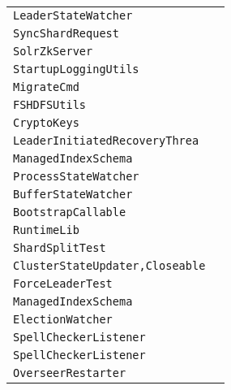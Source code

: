 \begin{center}
\begin{tabular}{ll}
\lstinline/LeaderStateWatcher/&\raisebox{0pt}{\lstinline/process(WatchedEventevent)/}\\
\lstinline/SyncShardRequest/&\raisebox{0pt}{\lstinline/handleUpdates(ShardResponsesrsp)/}\\
\lstinline/SolrZkServer/&\raisebox{0pt}{\lstinline/start()/}\\
\lstinline/StartupLoggingUtils/&\raisebox{0pt}{\lstinline/logNotSupported(Stringmsg)/}\\
\lstinline/MigrateCmd/&\raisebox{0pt}{\lstinline/migrateKey(ClusterStatecluster)/}\\
\lstinline/FSHDFSUtils/&\raisebox{0pt}{\lstinline/booleanisFileClosed(Method,Path)/}\\
\lstinline/CryptoKeys/&\raisebox{0pt}{\lstinline/Stringverify(String,Byte)/}\\
\lstinline/LeaderInitiatedRecoveryThrea/&\raisebox{0pt}{\lstinline/publishDownState(String,boolean))/}\\
\lstinline/ManagedIndexSchema/&\raisebox{0pt}{\lstinline/newFieldType(String))/}\\
\lstinline/ProcessStateWatcher/&\raisebox{0pt}{\lstinline/process(WatchedEventevent)/}\\
\lstinline/BufferStateWatcher/&\raisebox{0pt}{\lstinline/process(WatchedEventevent)/}\\
\lstinline/BootstrapCallable/&\raisebox{0pt}{\lstinline/Booleancall()/}\\
\lstinline/RuntimeLib/&\raisebox{0pt}{\lstinline/verify()/}\\
\lstinline/ShardSplitTest/&\raisebox{0pt}{\lstinline/logDebugHelp(QueryResponser,long)/}\\
\lstinline/ClusterStateUpdater,Closeable/&\raisebox{0pt}{\lstinline/LeaderStatusamILeader()/}\\
\lstinline/ForceLeaderTest/&\raisebox{0pt}{\lstinline/bringBackOldLeaderAndSendDoc(String)/}\\
\lstinline/ManagedIndexSchema/&\raisebox{0pt}{\lstinline/newFieldType(String))/}\\
\lstinline/ElectionWatcher/&\raisebox{0pt}{\lstinline/process(WatchedEventevent)/}\\
\lstinline/SpellCheckerListener/&\raisebox{0pt}{\lstinline/buildSpellIndex(sendBootstrapCommand)/}\\
\lstinline/SpellCheckerListener/&\raisebox{0pt}{\lstinline/buildSpellIndex(sendBootstrapCommand)/}\\
\lstinline/OverseerRestarter/&\raisebox{0pt}{\lstinline/run()/}\\

\end{tabular}
\end{center}
